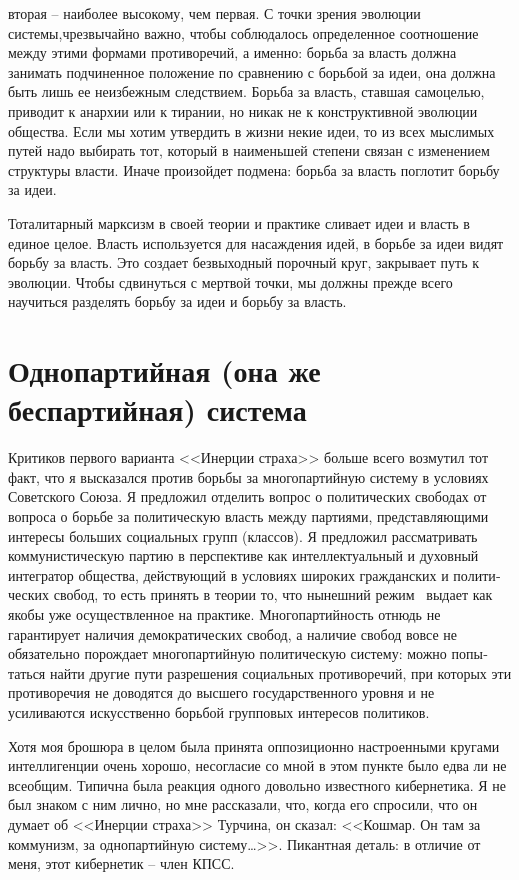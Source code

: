 \documentclass{book}
\begin{document}
вторая -- наиболее высокому, чем первая. С точки зрения эво­люции системы,чрезвычайно важно, чтобы соблюдалось опреде­ленное соотношение между этими формами противоречий, а именно: борьба за власть должна занимать подчиненное поло­жение по сравнению с борьбой за идеи, она должна быть лишь ее неизбежным следствием. Борьба за власть, ставшая само­целью, приводит к анархии или к тирании, но никак не к кон­структивной эволюции общества. Если мы хотим утвердить в жизни некие идеи, то из всех мыслимых путей надо выбирать тот, который в наименьшей степени связан с изменением струк­туры власти. Иначе произойдет подмена: борьба за власть по­глотит борьбу за идеи.

Тоталитарный марксизм в своей теории и практике сливает идеи и власть в единое целое. Власть используется для насаж­дения идей, в борьбе за идеи видят борьбу за власть. Это со­здает безвыходный порочный круг, закрывает путь к эволю­ции. Чтобы сдвинуться с мертвой точки, мы должны прежде всего научиться разделять борьбу за идеи и борьбу за власть.


\section{Однопартийная (она же беспартийная) система}

Критиков первого варианта <<Инерции страха>> больше всего возмутил тот факт, что я высказался против борьбы за много­партийную систему в условиях Советского Союза. Я предло­жил отделить вопрос о политических свободах от вопроса о борьбе за политическую власть между партиями, представля­ющими интересы больших социальных групп (классов). Я предложил рассматривать коммунистическую партию в пер­спективе как интеллектуальный и духовный интегратор общества, действующий в условиях широких гражданских и полити­ческих свобод, то есть принять в теории то, что нынешний ре­жим  выдает как якобы уже осуществленное на практике. Многопартийность отнюдь не гарантирует наличия демократи­ческих свобод, а наличие свобод вовсе не обязательно порож­дает многопартийную политическую систему: можно попы­таться найти другие пути разрешения социальных противоре­чий, при которых эти противоречия не доводятся до высшего государственного уровня и не усиливаются искусственно борь­бой групповых интересов политиков.

Хотя моя брошюра в целом была принята оппозиционно настроенными кругами интеллигенции очень хорошо, несо­гласие со мной в этом пункте было едва ли не всеобщим. Ти­пична была реакция одного довольно известного кибернетика. Я не был знаком с ним лично, но мне рассказали, что, когда его спросили, что он думает об <<Инерции страха>> Турчина, он сказал: <<Кошмар. Он там за коммунизм, за однопартийную систему\ldots>>. Пикантная деталь: в отличие от меня, этот кибер­нетик -- член КПСС.
\end{document}
